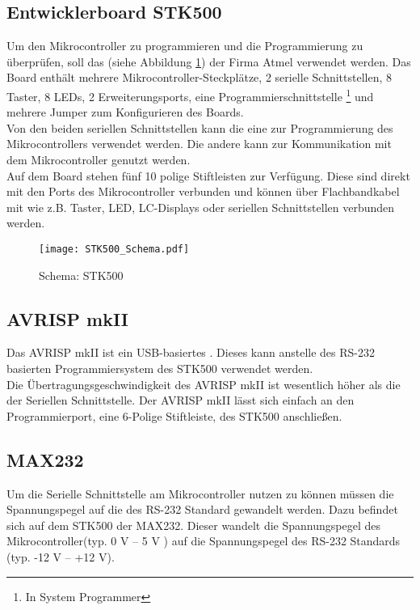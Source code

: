 \subsection{Entwicklerboard STK500}
\label{sec:STK500}
Um den Mikrocontroller zu programmieren und die Programmierung zu überprüfen, soll das (siehe Abbildung \ref{fig:STK500}) der Firma Atmel verwendet werden. Das Board enthält mehrere Mikrocontroller-Steckplätze, 2 serielle Schnittstellen, 8 Taster, 8 LEDs, 2 Erweiterungsports, eine Programmierschnittstelle \footnote{In System Programmer} und mehrere Jumper zum Konfigurieren des Boards.\\
Von den beiden seriellen Schnittstellen kann die eine zur Programmierung des Mikrocontrollers verwendet werden. Die andere kann zur Kommunikation mit dem Mikrocontroller genutzt werden.\\
Auf dem Board stehen fünf 10 polige Stiftleisten 
zur Verfügung. Diese sind direkt mit den Ports des Mikrocontroller verbunden und können über Flachbandkabel mit  wie z.B. Taster, LED, LC-Displays oder seriellen Schnittstellen verbunden werden.
\begin{figure}[htb]
\centering
\texttt{[image: STK500\_Schema.pdf]}
\caption{Schema: STK500}
\label{fig:STK500}
\citep{atmel:ug_STK500}
\end{figure}

\subsection{AVRISP mkII}
\label{sec:AVRISP}
Das AVRISP mkII ist ein USB-basiertes . Dieses kann anstelle des RS-232 basierten Programmiersystem des STK500 verwendet werden.\\
Die Übertragungsgeschwindigkeit des AVRISP mkII ist wesentlich höher als die der Seriellen Schnittstelle. 
Der AVRISP mkII lässt sich einfach an den Programmierport, eine 6-Polige Stiftleiste, des STK500 anschließen.

\subsection{MAX232}
\label{sec:MAX232}
Um die Serielle Schnittstelle am Mikrocontroller nutzen zu können müssen die Spannungspegel auf die des RS-232 Standard gewandelt werden. Dazu befindet sich auf dem STK500 der  MAX232. 
Dieser wandelt die Spannungspegel des Mikrocontroller(typ. 0 V -- 5 V ) auf die Spannungspegel des RS-232 Standards (typ. -12 V -- +12 V).

